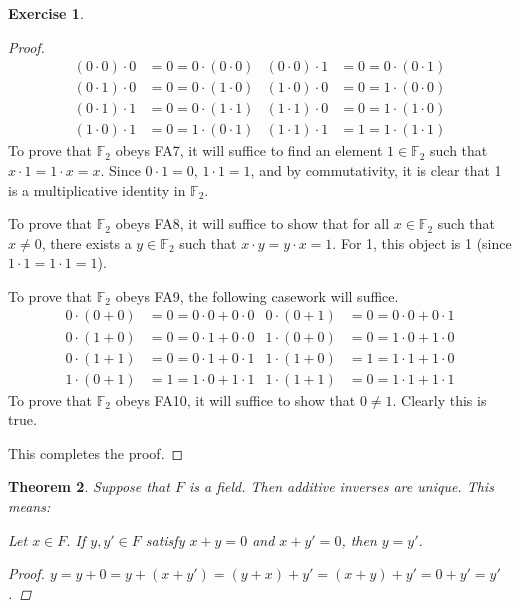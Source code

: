 \documentclass[11pt]{article}
\newcommand{\bbF}{\mathbb{F}}
\newtheorem{theorem}{Theorem}[section]
\theoremstyle{definition}
\newtheorem{exercise}[theorem]{Exercise}
\numberwithin{equation}{subsection}
\begin{document}
\begin{exercise}
\begin{proof}
        \begin{align*}
            (0\cdot 0)\cdot 0 &= 0 = 0\cdot (0\cdot 0)&
            (0\cdot 0)\cdot 1 &= 0 = 0\cdot (0\cdot 1)\\
            (0\cdot 1)\cdot 0 &= 0 = 0\cdot (1\cdot 0)&
            (1\cdot 0)\cdot 0 &= 0 = 1\cdot (0\cdot 0)\\
            (0\cdot 1)\cdot 1 &= 0 = 0\cdot (1\cdot 1)&
            (1\cdot 1)\cdot 0 &= 0 = 1\cdot (1\cdot 0)\\
            (1\cdot 0)\cdot 1 &= 0 = 1\cdot (0\cdot 1)&
            (1\cdot 1)\cdot 1 &= 1 = 1\cdot (1\cdot 1)
        \end{align*}
        To prove that $\bbF_2$ obeys FA7, it will suffice to find an element $1\in\bbF_2$ such that $x\cdot 1=1\cdot x=x$. Since $0\cdot 1=0$, $1\cdot 1=1$, and by commutativity, it is clear that 1 is a multiplicative identity in $\bbF_2$.\par
        To prove that $\bbF_2$ obeys FA8, it will suffice to show that for all $x\in\bbF_2$ such that $x\neq 0$, there exists a $y\in\bbF_2$ such that $x\cdot y=y\cdot x=1$. For 1, this object is 1 (since $1\cdot 1=1\cdot 1=1$).\par
        To prove that $\bbF_2$ obeys FA9, the following casework will suffice.
        \begin{align*}
            0\cdot(0+0) &= 0 = 0\cdot 0+0\cdot 0&
            0\cdot(0+1) &= 0 = 0\cdot 0+0\cdot 1\\
            0\cdot(1+0) &= 0 = 0\cdot 1+0\cdot 0&
            1\cdot(0+0) &= 0 = 1\cdot 0+1\cdot 0\\
            0\cdot(1+1) &= 0 = 0\cdot 1+0\cdot 1&
            1\cdot(1+0) &= 1 = 1\cdot 1+1\cdot 0\\
            1\cdot(0+1) &= 1 = 1\cdot 0+1\cdot 1&
            1\cdot(1+1) &= 0 = 1\cdot 1+1\cdot 1
        \end{align*}
        To prove that $\bbF_2$ obeys FA10, it will suffice to show that $0\neq 1$. Clearly this is true.

This completes the proof.

\renewcommand\qedsymbol{QED}
\end{proof}

\end{exercise}



\begin{theorem}
	Suppose that $F$ is a field.  Then additive inverses are unique.  This means:

 Let $x \in F$.  If $y, y' \in F$ satisfy $x + y = 0$ and $x + y' = 0$, then $y = y'$.
\begin{proof}
$y=y+0=y+(x+y')=(y+x)+y'=(x+y)+y'=0+y'=y'$.

\renewcommand\qedsymbol{QED}
\end{proof}

\end{theorem}
\end{document}

